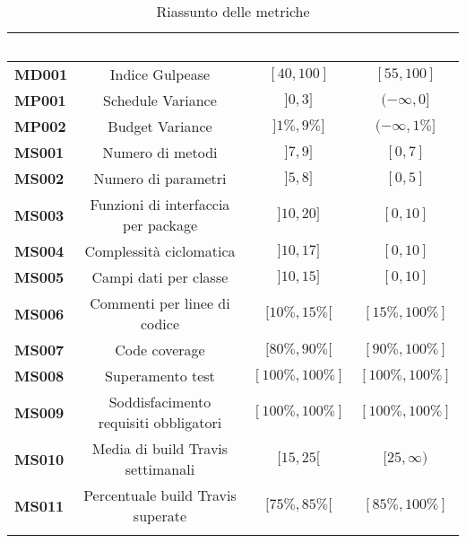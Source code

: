 	\renewcommand{\arraystretch}{1.5}
	\begin{longtable}{C{4cm} c c c}
	
	\textcolor{white}{\textbf{Codice}} &
	\textcolor{white}{\textbf{Nome}} &
	\textcolor{white}{\textbf{Accettabile}} &
	\textcolor{white}{\textbf{Ottimale}}\\
	\endhead

	\textbf{MD001} &
	Indice Gulpease &
	$[40 , 100] $&
	$[55 , 100]$\\

	\textbf{MP001} &
	Schedule Variance &
	$]0 , 3] $&
	$(-\infty , 0]$\\
	
	\textbf{MP002} &
	Budget Variance &
	$]1\% , 9\%] $&
	$(-\infty , 1\%]$\\


	\textbf{MS001} &
	Numero di metodi &
	$]7 , 9] $&
	$[0 , 7]$\\
	
	\textbf{MS002} &
	Numero di parametri &
	$]5 , 8] $&
	$[0 , 5]$\\
	
	\textbf{MS003} &
	Funzioni di interfaccia per package &
	$]10 , 20] $&
	$[0 , 10]$\\
	
	\textbf{MS004} &
	Complessità ciclomatica &
	$]10 , 17] $&
	$[0 , 10]$\\
	
	\textbf{MS005} &
	Campi dati per classe &
	$]10 , 15] $&
	$[0 , 10]$\\
	
	\textbf{MS006} &
	Commenti per linee di codice &
	$[10\%, 15\%[ $&
	$[15\% , 100\%]$\\
	
	\textbf{MS007} &
	Code coverage &
	$[80\%, 90\%[$&
	$[90\%, 100\%]$\\

	
	\textbf{MS008} &
	Superamento test &
	$[100\%, 100\%]$&
	$[100\%, 100\%]$\\
	
	\textbf{MS009} &
	Soddisfacimento requisiti obbligatori &
	$[100\%, 100\%]$&
	$[100\%, 100\%]$\\
	
	\textbf{MS010} &
	Media di build Travis settimanali &
	$[15,25[$&
	$[25,\infty)$\\
	
	\textbf{MS011} &
	Percentuale build Travis superate &
	$[75\%,85\%[$&
	$[85\%,100\%]$\\
	
	\caption{Riassunto delle metriche}\\	
	\end{longtable}